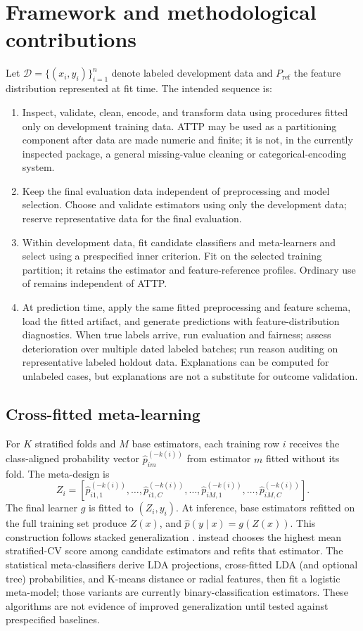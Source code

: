 \documentclass[conference]{IEEEtran}
\begin{document}
\section{Framework and methodological contributions}
Let \(\mathcal{D}=\{(x_i,y_i)\}_{i=1}^{n}\) denote labeled development data and \(P_{\mathrm{ref}}\) the feature distribution represented at fit time. The intended sequence is:
\begin{enumerate}
\item Inspect, validate, clean, encode, and transform data using procedures fitted only on development training data. ATTP may be used as a partitioning component after data are made numeric and finite; it is not, in the currently inspected package, a general missing-value cleaning or categorical-encoding system.
\item Keep the final evaluation data independent of preprocessing and model selection. Choose and validate estimators using only the development data; reserve representative data for the final evaluation.
\item Within development data, fit candidate classifiers and meta-learners and select using a prespecified inner criterion. Fit  on the selected training partition; it retains the estimator and feature-reference profiles. Ordinary use of  remains independent of ATTP.
\item At prediction time, apply the same fitted preprocessing and feature schema, load the fitted artifact, and generate predictions with feature-distribution diagnostics. When true labels arrive, run evaluation and fairness; assess deterioration over multiple dated labeled batches; run reason auditing on representative labeled holdout data. Explanations can be computed for unlabeled cases, but explanations are not a substitute for outcome validation.
\end{enumerate}

\subsection{Cross-fitted meta-learning}
For \(K\) stratified folds and \(M\) base estimators, each training row \(i\) receives the class-aligned probability vector \(\hat p_{im}^{(-k(i))}\) from estimator \(m\) fitted without its fold. The meta-design is
\[
Z_i = [\hat p_{i1,1}^{(-k(i))},\ldots,\hat p_{i1,C}^{(-k(i))},\ldots,
\hat p_{iM,1}^{(-k(i))},\ldots,\hat p_{iM,C}^{(-k(i))}].
\]
The final learner \(g\) is fitted to \((Z_i,y_i)\). At inference, base estimators refitted on the full training set produce \(Z(x)\), and \(\hat p(y\mid x)=g(Z(x))\). This construction follows stacked generalization \cite{wolpert1992}.  instead chooses the highest mean stratified-CV score among candidate estimators and refits that estimator. The statistical meta-classifiers derive LDA projections, cross-fitted LDA (and optional tree) probabilities, and K-means distance or radial features, then fit a logistic meta-model; those variants are currently binary-classification estimators. These algorithms are not evidence of improved generalization until tested against prespecified baselines.
\end{document}

